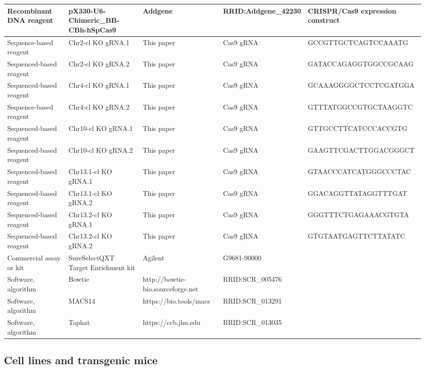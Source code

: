 \documentclass[11pt,a4paper]{article}
\begin{document}
\begin{table}[h]
\begin{tabular}{|l|l|l|l|l|}
Recombinant DNA reagent & pX330-U6-Chimeric\_BB-CBh-hSpCas9 & Addgene & RRID:Addgene\_42230 & CRISPR/Cas9 expression construct \\ \hline
Sequence-based reagent & Chr2-cl KO gRNA.1 & This paper & Cas9 gRNA & GCCGTTGCTCAGTCCAAATG \\ \hline
Sequenced-based reagent & Chr2-cl KO gRNA.2 & This paper & Cas9 gRNA & GATACCAGAGGTGGCCGCAAG \\ \hline
Sequenced-based reagent & Chr4-cl KO gRNA.1 & This paper & Cas9 gRNA & GCAAAGGGGCTCCTCGATGGA \\ \hline
Sequence-based reagent & Chr4-cl KO gRNA.2 & This paper & Cas9 gRNA & GTTTATGGCCGTGCTAAGGTC \\ \hline
Sequenced-based reagent & Chr10-cl KO gRNA.1 & This paper & Cas9 gRNA & GTTGCCTTCATCCCACCGTG \\ \hline
Sequenced-based reagent & Chr10-cl KO gRNA.2 & This paper & Cas9 gRNA & GAAGTTCGACTTGGACGGGCT \\ \hline
Sequenced-based reagent & Chr13.1-cl KO gRNA.1 & This paper & Cas9 gRNA & GTAACCCATCATGGGCCCTAC \\ \hline
Sequenced-based reagent & Chr13.1-cl KO gRNA.2 & This paper & Cas9 gRNA & GGACAGGTTATAGGTTTGAT \\ \hline
Sequenced-based reagent & Chr13.2-cl KO gRNA.1 & This paper & Cas9 gRNA & GGGTTTCTGAGAAACGTGTA \\ \hline
Sequenced-based reagent & Chr13.2-cl KO gRNA.2 & This paper & Cas9 gRNA & GTGTAATGAGTTCTTATATC \\ \hline
Commercial assay or kit & SureSelectQXT Target Enrichment kit & Agilent & G9681-90000 &  \\ \hline
Software, algorithm & Bowtie & http://bowtie-bio.sourceforge.net & RRID:SCR\_005476 &  \\ \hline
Software, algorithm & MACS14 & https://bio.tools/macs & RRID:SCR\_013291 &  \\ \hline
Software, algorithm & Tophat & https://ccb.jhu.edu & RRID:SCR\_013035 &  \\ \hline
\end{tabular}
\end{table}

\subsection{Cell lines and transgenic mice}
\end{document}
